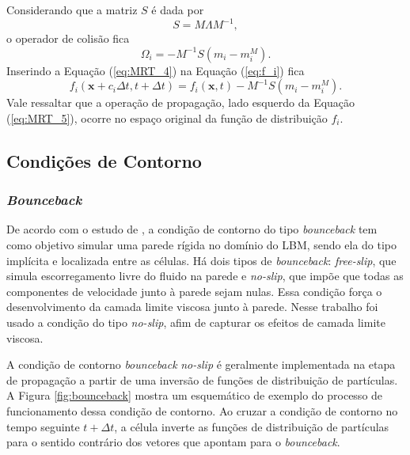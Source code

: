 Considerando que a matriz \textbf{$S$} é dada por
\begin{equation}
	\textbf{$S$} = \textbf{$M$}\textbf{$\Lambda$}\textbf{$M$}^{-1},
    \label{eq:MRT_3}
\end{equation}
o operador de colisão fica
\begin{equation}
	\Omega_{i} = -\textbf{$M$}^{-1}\textbf{$S$}(m_{i} - m_{i}^{M}).
    \label{eq:MRT_4}
\end{equation}
Inserindo a Equação (\ref{eq:MRT_4}) na Equação (\ref{eq:f_i}) fica
\begin{equation}
	f_{i}(\textbf{x} + c_{i}\Delta t, t + \Delta t) = f_{i}(\textbf{x}, t) -\textbf{$M$}^{-1}\textbf{$S$}(m_{i} - m_{i}^{M}).
    \label{eq:MRT_5}
\end{equation}
Vale ressaltar que a operação de propagação, lado esquerdo da Equação (\ref{eq:MRT_5}), ocorre no espaço original da função de distribuição $f_{i}$.


\subsection{Condições de Contorno}

\subsubsection{\textit{Bounceback}}

De acordo com o estudo de , a condição de contorno do tipo \textit{bounceback} tem como objetivo simular uma parede rígida no domínio do LBM, sendo ela do tipo implícita e localizada entre as células. Há dois tipos de \textit{bounceback}: \textit{free-slip}, que simula escorregamento livre do fluido na parede e \textit{no-slip}, que impõe que todas as componentes de velocidade junto à parede sejam nulas. Essa condição força o desenvolvimento da camada limite viscosa junto à parede. Nesse trabalho foi usado a condição do tipo \textit{no-slip}, afim de capturar os efeitos de camada limite viscosa.

A condição de contorno \textit{bounceback} \textit{no-slip} é geralmente implementada na etapa de propagação a partir de uma inversão de funções de distribuição de partículas. A Figura \ref{fig:bounceback} mostra um esquemático de exemplo do processo de funcionamento dessa condição de contorno. Ao cruzar a condição de contorno no tempo seguinte $t + \Delta t$, a célula inverte as funções de distribuição de partículas para o sentido contrário dos vetores que apontam para o \textit{bounceback}.

